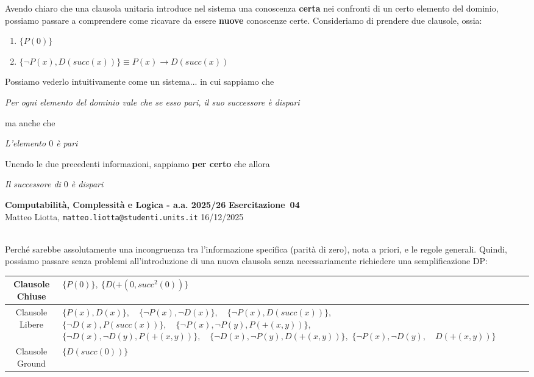 \documentclass[a4paper,10pt]{article}
\makeatletter
\newcommand{\DocType}{Esercitazione} %
\newcommand{\FullTitle}{\DocType\ \EsercitazioneNum}
\newcommand{\Header}{
\noindent
  \small \textbf{Computabilità, Complessità e Logica - a.a. 2025/26} \hfill \textbf{\FullTitle} \\[0.2cm]
  \scriptsize Matteo Liotta, \texttt{matteo.liotta@studenti.units.it} \hfill \Data \\[0.2cm]
  \noindent\makebox[\linewidth]{\rule{\linewidth}{0.4pt}} \\[0.3cm]}
\newcommand{\NewPageHeader}{
  \vfill
  \noindent\makebox[\linewidth]{\rule{\linewidth}{0.4pt}}
  \newpage
  {\Header}
}
\newcommand{\EsercitazioneNum}{04}
\newcommand{\Data}{16/12/2025}
\makeatother
\begin{document}
Avendo chiaro che una clausola unitaria introduce nel sistema una conoscenza \textbf{certa} nei confronti di un certo elemento del dominio, possiamo passare a comprendere come ricavare da essere \textbf{nuove} conoscenze certe.
Consideriamo di prendere due clausole, ossia:
\begin{enumerate}
    \item $\{P(0)\}$
    \item $\{\lnot P(x),D(succ(x))\}\equiv P(x)\rightarrow D(succ(x))$ 
\end{enumerate}

Possiamo vederlo intuitivamente come un sistema... in cui sappiamo che

\begin{center}
    \textit{Per ogni elemento del dominio vale che se esso pari, il suo successore è dispari}
\end{center}

ma anche che 

\begin{center}
    \textit{L'elemento $0$ è pari}
\end{center}

Unendo le due precedenti informazioni, sappiamo \textbf{per certo} che allora
\begin{center}
    \textit{Il successore di $0$ è dispari}
\end{center}
\NewPageHeader
Perché sarebbe assolutamente una incongruenza tra l'informazione specifica (parità di zero), nota a priori, e le regole generali. Quindi, possiamo passare senza problemi all'introduzione di una nuova clausola senza necessariamente richiedere una semplificazione DP:

\begin{table}[h]
    \centering
    \small 
    \renewcommand{\arraystretch}{1.5} 
    
    \begin{tabularx}{\textwidth}{|c|>{\centering\arraybackslash}X|}
        \hline
        Clausole Chiuse & $\{P(0)\}, \ \{D(+(0,succ^2(0))\}$ \\
        \hline
        Clausole Libere & 
            $\{P(x), D(x)\},\quad \{\lnot P(x), \lnot D(x)\},\quad \{\lnot P(x), D(succ(x))\},$\newline
            $\{\lnot D(x), P(succ(x))\},\quad \{\lnot P(x), \lnot P(y), P(+(x, y))\},$\newline
            $\{\lnot D(x), \lnot D(y), P(+(x, y))\},\quad \{\lnot D(x), \lnot P(y), D(+(x, y))\},$\newline
            $\{\lnot P(x), \lnot D(y),\quad D(+(x, y))\}$ 
            \\
        \hline
        Clausole Ground & $\{D(succ(0))\}$ \\
        \hline
    \end{tabularx}
\end{table}
\end{document}
